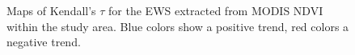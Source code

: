 \begin{figure}[htpb]
	\centering
	\caption{Maps of Kendall's $ \tau $ for the EWS extracted from MODIS NDVI within the study area. Blue colors show a positive trend, red colors a negative trend.}\label{res:ndvi_ews_maps}
\end{figure}	
